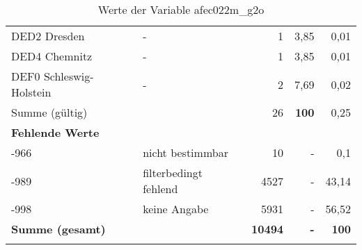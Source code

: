 \begin{longtable}{Xlrrr}
     \multicolumn{1}{X}{DED2 Dresden} &
     - &
     1 &
     3,85 &
     0,01 \\

     \multicolumn{1}{X}{DED4 Chemnitz} &
     - &
     1 &
     3,85 &
     0,01 \\

     \multicolumn{1}{X}{DEF0 Schleswig-Holstein} &
     - &
     2 &
     7,69 &
     0,02 \\
     \midrule
      \multicolumn{2}{l}{Summe (gültig)} & 26 &
      \textbf{100} &
         0,25 \\
     \multicolumn{5}{l}{\textbf{Fehlende Werte}}\\
       -966 & nicht bestimmbar & 10 & - & 0,1 \\

       -989 & filterbedingt fehlend & 4527 & - & 43,14 \\

       -998 & keine Angabe & 5931 & - & 56,52 \\

     \midrule
     \multicolumn{2}{l}{\textbf{Summe (gesamt)}} & \textbf{10494} & \textbf{-} & \textbf{100} \\
     \bottomrule
     \caption{Werte der Variable afec022m\_g2o}
     \end{longtable}
     
